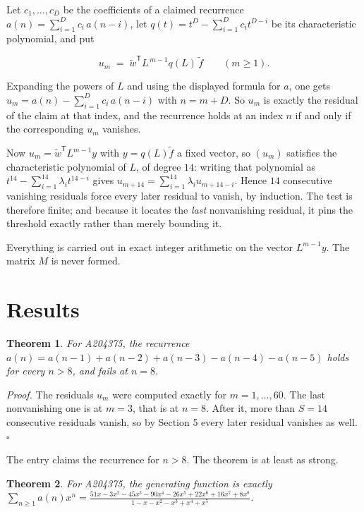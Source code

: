 \documentclass[11pt]{article}
\newtheorem{theorem}{Theorem}
\theoremstyle{definition}
\begin{document}
Let $c_1,\dots,c_D$ be the coefficients of a claimed recurrence $a(n) = \sum_{i=1}^{D} c_i\,a(n-i)$, let $q(t) = t^{D} - \sum_{i=1}^{D} c_i t^{D-i}$ be its characteristic polynomial, and put

\[u_m \;=\; \tilde w^{\mathsf T} L^{\,m-1} q(L)\,\tilde f \qquad (m \ge 1).\]

Expanding the powers of $L$ and using the displayed formula for $a$, one gets $u_m = a(n) - \sum_{i=1}^{D} c_i\,a(n-i)$ with $n = m + D$. So $u_m$ is exactly the residual of the claim at that index, and the recurrence holds at an index $n$ if and only if the corresponding $u_m$ vanishes.

Now $u_m = \tilde w^{\mathsf T} L^{m-1} y$ with $y = q(L)\tilde f$ a fixed vector, so $(u_m)$ satisfies the characteristic polynomial of $L$, of degree $14$: writing that polynomial as $t^{14} - \sum_{i=1}^{14} \lambda_i t^{14-i}$ gives $u_{m+14} = \sum_{i=1}^{14} \lambda_i u_{m+14-i}$. Hence $14$ consecutive vanishing residuals force every later residual to vanish, by induction. The test is therefore finite; and because it locates the {\itshape last} nonvanishing residual, it pins the threshold exactly rather than merely bounding it.

Everything is carried out in exact integer arithmetic on the vector $L^{m-1}y$. The matrix $M$ is never formed.

\section{Results}

\begin{theorem} For A204375, the recurrence $a(n) = a(n-1) + a(n-2) + a(n-3) - a(n-4) - a(n-5)$ holds for every $n > 8$, and fails at $n = 8$.\end{theorem}

{\itshape Proof.} The residuals $u_m$ were computed exactly for $m = 1,\dots,60$. The last nonvanishing one is at $m = 3$, that is at $n = 8$. After it, more than $S = 14$ consecutive residuals vanish, so by Section 5 every later residual vanishes as well. $\square$

The entry claims the recurrence for $n > 8$. The theorem is at least as strong.

\begin{theorem} For A204375, the generating function is exactly $\sum_{n\ge 1} a(n)x^n = \frac{51x - 3x^{2} - 45x^{3} - 90x^{4} - 26x^{5} + 22x^{6} + 16x^{7} + 8x^{8}}{1 - x - x^{2} - x^{3} + x^{4} + x^{5}}$.\end{theorem}
\end{document}
